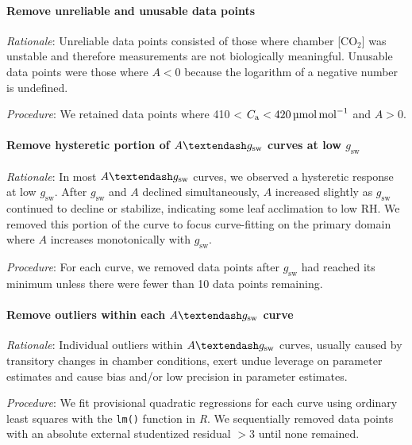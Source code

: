\documentclass[
  letterpaper,
  DIV=11,
  numbers=noendperiod]{scrartcl}
\let\oldparagraph\paragraph
\renewcommand{\paragraph}[1]{\oldparagraph{#1}\mbox{}}
\newcommand{\agcurve}{$A \textendash g_\text{sw}$}
\newcommand{\cabetween}[2]{#1 < $C_\mathrm{a} < \qty{#2}{\micro\mol\raiseto{-1}\mol}$}
\newcommand{\gsw}{$g_\text{sw}$}
\newcommand{\rh}{$\mathrm{RH}$}
\begin{document}
\paragraph{Remove unreliable and unusable data
points}\label{remove-unreliable-and-unusable-data-points}

\emph{Rationale}: Unreliable data points consisted of those where
chamber {[}CO\(_2\){]} was unstable and therefore measurements are not
biologically meaningful. Unusable data points were those where \(A < 0\)
because the logarithm of a negative number is undefined.

\emph{Procedure}: We retained data points where \cabetween{410}{420} and
\(A> 0\).

\paragraph{\texorpdfstring{Remove hysteretic portion of \agcurve{}
curves at low
\gsw{}}{Remove hysteretic portion of  curves at low }}\label{remove-hysteretic-portion-of-curves-at-low}

\emph{Rationale}: In most \agcurve{} curves, we observed a hysteretic
response at low \gsw. After \gsw{} and \(A\) declined simultaneously,
\(A\) increased slightly as \gsw{} continued to decline or stabilize,
indicating some leaf acclimation to low \rh. We removed this portion of
the curve to focus curve-fitting on the primary domain where \(A\)
increases monotonically with \gsw{}.

\emph{Procedure}: For each curve, we removed data points after \gsw{}
had reached its minimum unless there were fewer than 10 data points
remaining.

\paragraph{\texorpdfstring{Remove outliers within each \agcurve{}
curve}{Remove outliers within each  curve}}\label{remove-outliers-within-each-curve}

\emph{Rationale}: Individual outliers within \agcurve{} curves, usually
caused by transitory changes in chamber conditions, exert undue leverage
on parameter estimates and cause bias and/or low precision in parameter
estimates.

\emph{Procedure}: We fit provisional quadratic regressions for each
curve using ordinary least squares with the \texttt{lm()} function in
\emph{R}. We sequentially removed data points with an absolute external
studentized residual \(> 3\) until none remained.
\end{document}
